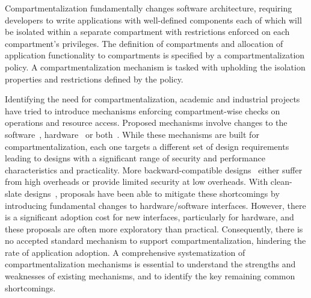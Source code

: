 Compartmentalization fundamentally changes software architecture, requiring
developers to write applications with well-defined components each of which will
be isolated within a separate compartment with restrictions enforced on each
compartment's privileges.
The definition of compartments and allocation of application functionality to
compartments is specified by a compartmentalization policy.
A compartmentalization mechanism is tasked with upholding the isolation
properties and restrictions defined by the policy.

Identifying the need for compartmentalization, academic and industrial projects
have tried to introduce mechanisms enforcing compartment-wise checks on
operations and resource access.
Proposed mechanisms involve changes to the software~\cite{LittonVE0BD16}, 
hardware~\cite{DuHXZC19XPC,VilanovaBNEV14,SchrammelWSS0MG20Donky,
BhattacharyyaHLGSFP23,ParkLXMK19,ERIMOberwagner19}
or both~\cite{WatsonWNMACDDGL15}.
While these mechanisms are built for compartmentalization, each one targets a
different set of design requirements leading to designs with a significant
range of security and performance characteristics and practicality.
More backward-compatible designs~\cite{ERIMOberwagner19,LittonVE0BD16,ParkLXMK19}
either suffer from high overheads or provide limited security at low
overheads.
With clean-slate designs~\cite{WatsonWNMACDDGL15,BhattacharyyaHLGSFP23,YuWBCS23CAPSTONE}, 
proposals have been able to mitigate these
shortcomings by introducing fundamental changes to hardware/software
interfaces.
However, there is a significant adoption cost for new interfaces,
particularly for hardware, and these proposals are often more exploratory
than practical.
Consequently, there is no accepted standard mechanism to support
compartmentalization, hindering the rate of application adoption.
A comprehensive systematization of compartmentalization mechanisms is
essential to understand the strengths and weaknesses of existing
mechanisms, and to identify the key remaining common shortcomings.

